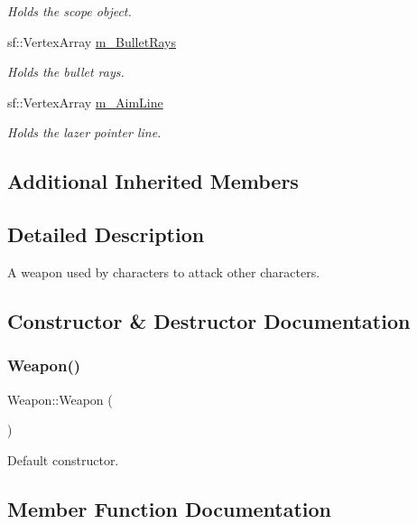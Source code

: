 \begin{DoxyCompactItemize}
\begin{DoxyCompactList}\small\item\em Holds the scope object. \end{DoxyCompactList}\item 
sf\+::\+Vertex\+Array \hyperlink{class_weapon_add524156dbd04aee5b0e9210478f0fbc}{m\+\_\+\+Bullet\+Rays}
\begin{DoxyCompactList}\small\item\em Holds the bullet rays. \end{DoxyCompactList}\item 
sf\+::\+Vertex\+Array \hyperlink{class_weapon_a7b266850fb8ef8666f9f4d7d614dea26}{m\+\_\+\+Aim\+Line}
\begin{DoxyCompactList}\small\item\em Holds the lazer pointer line. \end{DoxyCompactList}\end{DoxyCompactItemize}
\subsection*{Additional Inherited Members}


\subsection{Detailed Description}
A weapon used by characters to attack other characters. 

\subsection{Constructor \& Destructor Documentation}
\mbox{\label{class_weapon_a42dbc46dd70319a24763992c4ebbd396}} 
\subsubsection{\texorpdfstring{Weapon()}{Weapon()}}
{\footnotesize\ttfamily Weapon\+::\+Weapon (\begin{DoxyParamCaption}{ }\end{DoxyParamCaption})}



Default constructor. 



\subsection{Member Function Documentation}
\mbox{\label{class_weapon_a90f6c7c9ca1465212aa5f46b2c183aa3}} 
